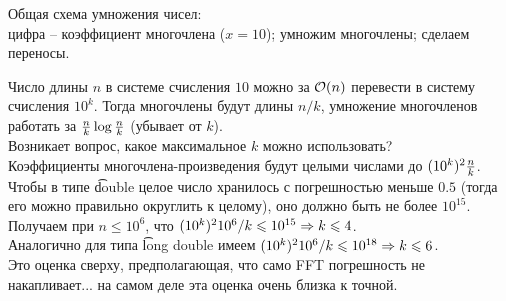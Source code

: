 Общая схема умножения чисел: \\
цифра -- коэффициент многочлена ($x = 10$); умножим многочлены; сделаем переносы.

\down
Число длины $n$ в системе счисления $10$ можно за $\mathcal{O}(n)$ перевести в систему счисления $10^k$.
Тогда многочлены будут длины $n/k$, умножение многочленов работать за ${\textstyle\frac{n}{k}}\log{\textstyle\frac{n}{k}}$ (убывает от $k$).\\
Возникает вопрос, какое максимальное $k$ можно использовать?\\
Коэффициенты многочлена-произведения будут целыми числами до $(10^k)^2 {\textstyle\frac{n}{k}}$.\\ 
Чтобы в типе \t{double} целое число хранилось с погрешностью меньше $0.5$ (тогда его можно правильно округлить к целому),
оно должно быть не более $10^{15}$. \\
Получаем при $n \le 10^6$, что $(10^k)^2 10^6 / k \leqslant 10^{15} \Rightarrow k \leqslant 4$.\\
Аналогично для типа \t{long double} имеем $(10^k)^2 10^6 / k \leqslant 10^{18} \Rightarrow k \leqslant 6$.\\
Это оценка сверху, предполагающая, что само FFT погрешность не накапливает... на самом деле эта оценка очень близка к точной.
